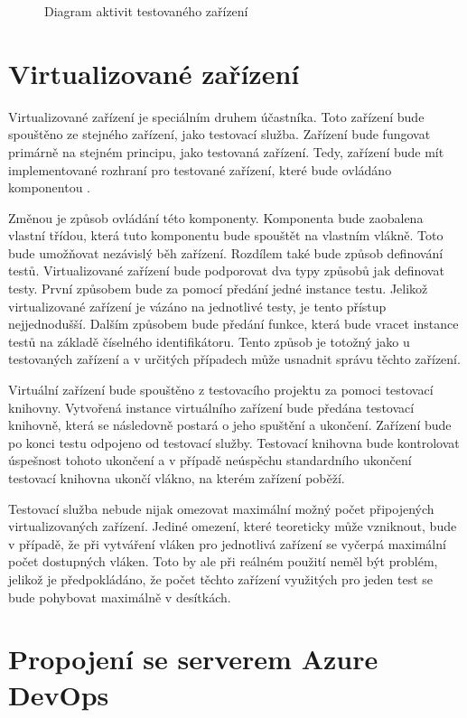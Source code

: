 \begin{figure}
    \caption{Diagram aktivit testovaného zařízení}
    \label{fig:act_diag_device}
\end{figure}


\section{Virtualizované zařízení}
Virtualizované zařízení je speciálním druhem účastníka. Toto zařízení bude spouštěno ze stejného zařízení, jako testovací služba. Zařízení bude fungovat primárně na stejném principu, jako testovaná zařízení. Tedy, zařízení bude mít implementované rozhraní pro testované zařízení, které bude ovládáno komponentou . 

Změnou je způsob ovládání této komponenty. Komponenta bude zaobalena vlastní třídou, která tuto komponentu bude spouštět na vlastním vlákně. Toto bude umožňovat nezávislý běh zařízení. Rozdílem také bude způsob definování testů. Virtualizované zařízení bude podporovat dva typy způsobů jak definovat testy. První způsobem bude za pomocí předání jedné instance testu. Jelikož virtualizované zařízení je vázáno na jednotlivé testy, je tento přístup nejjednodušší. Dalším způsobem bude předání funkce, která bude vracet instance testů na základě číselného identifikátoru. Tento způsob je totožný jako u testovaných zařízení a v určitých případech může usnadnit správu těchto zařízení. 

Virtuální zařízení bude spouštěno z testovacího projektu za pomoci testovací knihovny. Vytvořená instance virtuálního zařízení bude předána testovací knihovně, která se následovně postará o jeho spuštění a ukončení. Zařízení bude po konci testu odpojeno od testovací služby. Testovací knihovna bude kontrolovat úspešnost tohoto ukončení a v případě neúspěchu standardního ukončení testovací knihovna ukončí vlákno, na kterém zařízení poběží.

Testovací služba nebude nijak omezovat maximální možný počet připojených virtualizovaných zařízení. Jediné omezení, které teoreticky může vzniknout, bude v případě, že při vytváření vláken pro jednotlivá zařízení se vyčerpá maximální počet dostupných vláken. Toto by ale při reálném použití neměl být problém, jelikož je předpokládáno, že počet těchto zařízení využitých pro jeden test se bude pohybovat maximálně v desítkách. 


\section{Propojení se serverem Azure DevOps}

